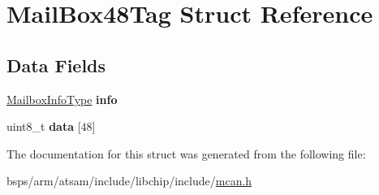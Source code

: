 \hypertarget{structMailBox48Tag}{}\section{Mail\+Box48\+Tag Struct Reference}
\label{structMailBox48Tag}
\subsection*{Data Fields}
\begin{DoxyCompactItemize}
\item 
\mbox{\label{structMailBox48Tag_aa91b806db565a0101397a64486096536}} 
\mbox{\hyperlink{structMailboxInfoTag}{Mailbox\+Info\+Type}} {\bfseries info}
\item 
\mbox{\label{structMailBox48Tag_aaf61ba5bb1f4dac737abc7bb8005617c}} 
uint8\+\_\+t {\bfseries data} \mbox{[}48\mbox{]}
\end{DoxyCompactItemize}


The documentation for this struct was generated from the following file\+:\begin{DoxyCompactItemize}
\item 
bsps/arm/atsam/include/libchip/include/\mbox{\hyperlink{mcan_8h}{mcan.\+h}}\end{DoxyCompactItemize}
